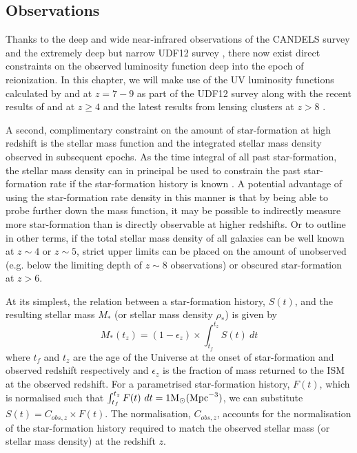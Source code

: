 \subsection{Observations}\label{sec:observations}
Thanks to the deep and wide near-infrared observations of the CANDELS survey \citep{2011ApJS..197...35G,Koekemoer:2011br} and the extremely deep but narrow UDF12 survey \citep{Koekemoer:2013db}, there now exist direct constraints on the observed luminosity function deep into the epoch of reionization. In this chapter, we will make use of the UV luminosity functions calculated by \citet{McLure:2013hh} and \citet{Schenker:2013cl} at $z = 7 - 9$ as part of the UDF12 survey along with the recent results of \citet{Bouwens:2014tx} and \citep{Finkelstein:2014ub} at $z \geq 4$ and the latest results from lensing clusters at $z >8$ \citep{Oesch:2014cs,McLeod:2014wz}.

A second, complimentary constraint on the amount of star-formation at high redshift is the stellar mass function and the integrated stellar mass density observed in subsequent epochs. As the time integral of all past star-formation, the stellar mass density can in principal be used to constrain the past star-formation rate if the star-formation history is known \citep{Stark:2007gi}.
A potential advantage of using the star-formation rate density in this manner is that by being able to probe further down the mass function, it may be possible to indirectly measure more star-formation than is directly observable at higher redshifts. Or to outline in other terms, if the total stellar mass density of all galaxies can be well known at $z\sim4$ or $z\sim5$, strict upper limits can be placed on the amount of unobserved (e.g. below the limiting depth of $z\sim8$ observations) or obscured star-formation at $z>6$.

At its simplest, the relation between a star-formation history, $S(t)$, and the resulting stellar mass  $M_{*}$ (or stellar mass density $\rho_{*}$) is given by
\begin{equation}
    M_{*}(t_{z}) = (1 - \epsilon_{z}) \times  \int_{t_{f}}^{t_{z}} S(t)~dt
\end{equation}
where $t_f$ and $t_z$ are the age of the Universe at the onset of star-formation and observed redshift respectively and $\epsilon_{z}$ is the fraction of mass returned to the ISM at the observed redshift. For a parametrised star-formation history, $F(t)$, which is normalised such that \( \int_{t_{f}}^{t_{z}} F(t)~dt = 1 \rm{M}_{\odot} (\rm{Mpc}^{-3}) \), we can substitute $S(t) = C_{obs,z}\times F(t)$. The normalisation, $C_{obs,z}$, accounts for the normalisation of the star-formation history required to match the observed stellar mass (or stellar mass density) at the redshift $z$. 

